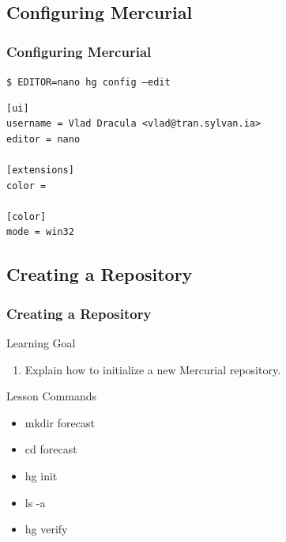 \documentclass{beamer}
\begin{document}
\subsection*{Configuring Mercurial}
\begin{frame}[fragile]
\frametitle{Configuring Mercurial}

\texttt{\$ EDITOR=nano hg config --edit} 

\begin{verbatim}
[ui]
username = Vlad Dracula <vlad@tran.sylvan.ia>
editor = nano

[extensions]
color =

[color]
mode = win32
\end{verbatim}

\end{frame}


\subsection*{Creating a Repository}
\begin{frame}
\frametitle{Creating a Repository}
\begin{block}{Learning Goal}
\begin{enumerate}
\item Explain how to initialize a new Mercurial repository.
\end{enumerate}
\end{block}

\begin{block}{Lesson Commands}
\begin{multicols}{2}
\begin{itemize}
\item mkdir forecast
\item cd forecast
\item hg init
\item ls -a
\item hg verify
\end{itemize}
\end{multicols}
\end{block}
\end{frame}
\end{document}
